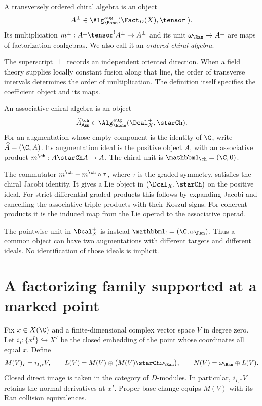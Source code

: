 \begin{definition}
\label{cbc:two:transverse}
A transversely ordered chiral algebra is an object
\[
 A^\perp\in\Alg_{\Eone}^{\mathrm{aug}}(\Fact_D(X),\tensor^!).
\]
Its multiplication $m^\perp:A^\perp\tensor^!A^\perp\to A^\perp$
and its unit $\omega_{\Ran}\to A^\perp$ are maps of factorization
coalgebras. We also call it an \emph{ordered chiral algebra}.
\end{definition}

The superscript $\perp$ records an independent oriented direction.
When a field theory supplies locally constant fusion along that line,
the order of transverse intervals determines the order of multiplication.
The definition itself specifies the coefficient object and its maps.

\begin{definition}
\label{cbc:two:chiral}
An associative chiral algebra is an object
\[
 \widehat A^{\ch}_{\mathsf{Ass}}
 \in\Alg_{\Eone}^{\mathrm{aug}}(\Dcal_X^+,\starCh).
\]
For an augmentation whose empty component is the identity of $\C$,
write $\widehat A=(\C,A)$. Its augmentation ideal is the positive object
$A$, with an associative product $m^{\ch}:A\starCh A\to A$.
The chiral unit is $\mathbbm1_{\ch}=(\C,0)$.
\end{definition}

The commutator $m^{\ch}-m^{\ch}\circ\tau$, where $\tau$ is the
graded symmetry, satisfies the chiral Jacobi identity.
It gives a Lie object in $(\Dcal_X,\starCh)$ on the positive ideal.
For strict differential graded products this follows by expanding Jacobi
and cancelling the associative triple products with their Koszul signs.
For coherent products it is the induced map from the Lie operad
to the associative operad.

The pointwise unit in $\Dcal_X^+$ is instead
$\mathbbm1_!=(\C,\omega_{\Ran})$.
Thus a common object can have two augmentations with different targets
and different ideals. No identification of those ideals is implicit.

\section{A factorizing family supported at a marked point}
Fix $x\in X(\C)$ and a finite-dimensional complex vector space $V$
in degree zero. Let $i_I:\{x^I\}\hookrightarrow X^I$ be the closed
embedding of the point whose coordinates all equal $x$. Define
\[
 M(V)_I=i_{I,*}V,\qquad
 L(V)=M(V)\oplus\bigl(M(V)\starCh\omega_{\Ran}\bigr),\qquad
 N(V)=\omega_{\Ran}\oplus L(V).
\]
Closed direct image is taken in the category of $D$-modules.
In particular, $i_{I,*}V$ retains the normal derivatives at $x^I$.
Proper base change equips $M(V)$ with its Ran collision equivalences.

